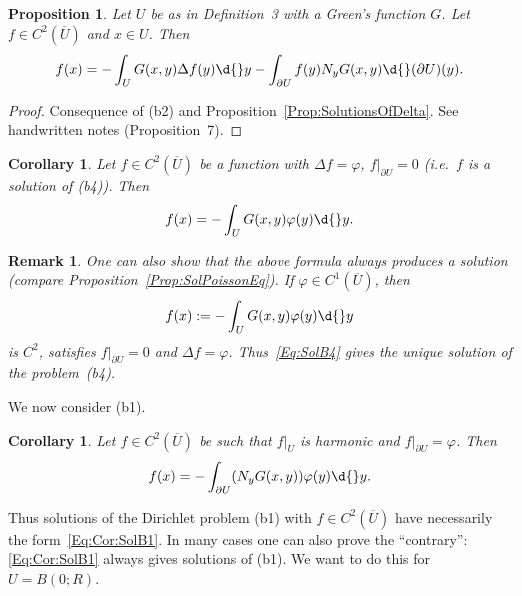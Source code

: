 \documentclass[12pt, oneside, a4paper]{article}
\newtheorem{prop}[thm]{Proposition}
\newtheorem{cor}[thm]{Corollary}
\theoremstyle{dfn}
\newtheorem{rem}[thm]{Remark}
\begin{document}
\begin{prop}
Let $U$ be as in Definition~3 with a Green's function $G$. Let $f \in C^2(\overline{U})$ and $x \in U$. Then
\[
f(x)
= - \int_U G(x,y) \Delta f(y) \d{}y
- \int_{\partial U} f(y) N_y G(x,y) \d{}(\partial U)(y).
\]
\end{prop}

\begin{proof}
Consequence of (b2) and Proposition~\ref{Prop:SolutionsOfDelta}. See handwritten notes (Proposition~7). %
\end{proof}

\begin{cor}
Let $f \in C^2(\overline{U})$ be a function with $\Delta f = \varphi$, $f|_{\partial U} = 0$ (i.e.\ $f$ is a solution of (b4)). Then
\[
f(x)
= - \int_U G(x,y) \varphi(y) \d{}y.
\]
\end{cor}


\begin{rem}
One can also show that the above formula always produces a solution (compare Proposition~\ref{Prop:SolPoissonEq}). If $\varphi \in C^1(\overline{U})$, then
\begin{equation}\label{Eq:SolB4}
f(x) := - \int_U G(x,y) \varphi(y) \d{}y
\end{equation}
is $C^2$, satisfies $f|_{\partial U} = 0$ and $\Delta f = \varphi$. Thus~\eqref{Eq:SolB4} gives the unique solution of the problem~(b4).
\end{rem}

We now consider (b1).

\begin{cor}\label{Cor:FormOfSolutionsOfB1}
Let $f \in C^2(\overline{U})$ be such that $f|_U$ is harmonic and $f|_{\partial U} = \varphi$. Then
\begin{equation}\label{Eq:Cor:SolB1}
f(x) = - \int_{\partial U} (N_y G(x,y)) \varphi(y) \d{}y.
\end{equation}
\end{cor}

Thus solutions of the Dirichlet problem (b1) with $f \in C^2(\overline{U})$ have necessarily the form~\eqref{Eq:Cor:SolB1}. In many cases one can also prove the ``contrary'': \eqref{Eq:Cor:SolB1} always gives solutions of (b1). We want to do this for $U = B(0;R)$.
\end{document}
